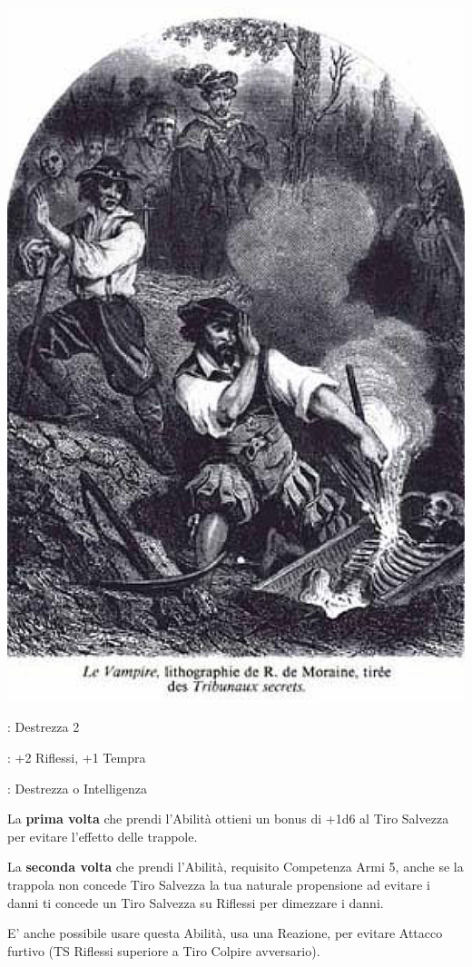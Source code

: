 \begin{multicols}{2}
\begin{center}
	\includegraphics[width=0.6\linewidth]{immagini/turning-undead-six.png}
\end{center}

\begin{description}[noitemsep, topsep=0pt, parsep=0pt, partopsep=0pt, leftmargin=0cm, labelwidth=2.5cm]
    \item[\textbf{Requisito}]: Destrezza 2
    \item[\textbf{Tiri Salvezza}]: +2 Riflessi, +1 Tempra
    \item[\textbf{Caratteristica}]: Destrezza o Intelligenza
\end{description}

La \textbf{prima volta} che prendi l'Abilità ottieni un bonus di +1d6 al Tiro Salvezza per evitare l'effetto delle trappole.

La \textbf{seconda volta} che prendi l'Abilità, requisito Competenza Armi 5, anche se la trappola non concede Tiro Salvezza la tua naturale propensione ad evitare i danni ti concede un Tiro Salvezza su Riflessi per dimezzare i danni.

E' anche possibile usare questa Abilità, usa una Reazione, per evitare Attacco furtivo (TS Riflessi superiore a Tiro Colpire avversario).



\end{multicols}
